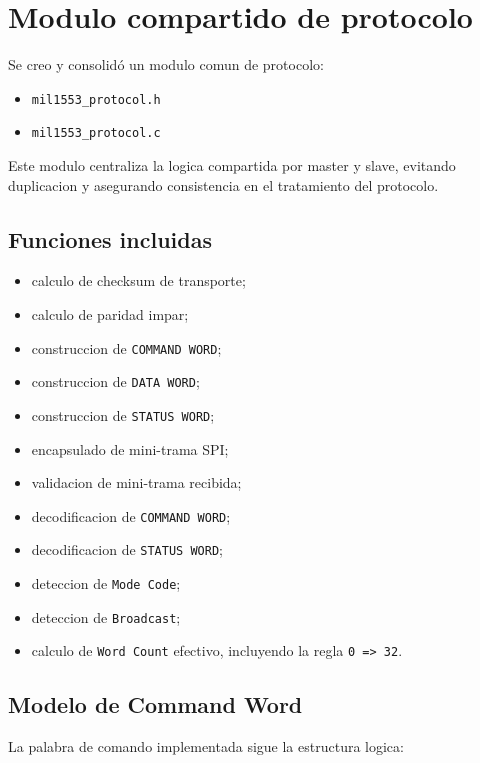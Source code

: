 \documentclass[12pt,a4paper]{article}
\begin{document}
\section{Modulo compartido de protocolo}

Se creo y consolidó un modulo comun de protocolo:

\begin{itemize}
    \item \texttt{mil1553\_protocol.h}
    \item \texttt{mil1553\_protocol.c}
\end{itemize}

Este modulo centraliza la logica compartida por master y slave, evitando duplicacion y asegurando
consistencia en el tratamiento del protocolo.

\subsection{Funciones incluidas}

\begin{itemize}
    \item calculo de checksum de transporte;
    \item calculo de paridad impar;
    \item construccion de \texttt{COMMAND WORD};
    \item construccion de \texttt{DATA WORD};
    \item construccion de \texttt{STATUS WORD};
    \item encapsulado de mini-trama SPI;
    \item validacion de mini-trama recibida;
    \item decodificacion de \texttt{COMMAND WORD};
    \item decodificacion de \texttt{STATUS WORD};
    \item deteccion de \texttt{Mode Code};
    \item deteccion de \texttt{Broadcast};
    \item calculo de \texttt{Word Count} efectivo, incluyendo la regla \texttt{0 => 32}.
\end{itemize}

\subsection{Modelo de Command Word}

La palabra de comando implementada sigue la estructura logica:
\end{document}
